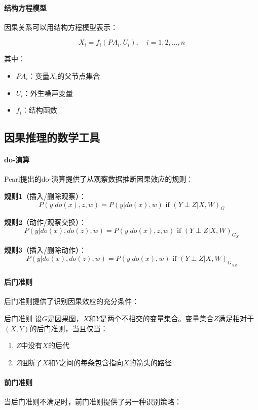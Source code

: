 \paragraph{结构方程模型}
因果关系可以用结构方程模型表示：

$$X_i = f_i(PA_i, U_i), \quad i = 1, 2, \ldots, n$$

其中：
\begin{itemize}
\item $PA_i$：变量$X_i$的父节点集合
\item $U_i$：外生噪声变量
\item $f_i$：结构函数
\end{itemize}

\subsection{因果推理的数学工具}

\paragraph{do-演算}
Pearl提出的do-演算提供了从观察数据推断因果效应的规则：

\textbf{规则1}（插入/删除观察）：
$$P(y|do(x), z, w) = P(y|do(x), w) \text{ if } (Y \perp Z | X, W)_G$$

\textbf{规则2}（动作/观察交换）：
$$P(y|do(x), do(z), w) = P(y|do(x), z, w) \text{ if } (Y \perp Z | X, W)_{G_{\overline{X}}}$$

\textbf{规则3}（插入/删除动作）：
$$P(y|do(x), do(z), w) = P(y|do(x), w) \text{ if } (Y \perp Z | X, W)_{G_{\overline{X}\underline{Z}}}$$

\paragraph{后门准则}
后门准则提供了识别因果效应的充分条件：

\begin{definition}[]{后门准则}
设$G$是因果图，$X$和$Y$是两个不相交的变量集合。变量集合$Z$满足相对于$(X,Y)$的后门准则，当且仅当：

\begin{enumerate}
\item $Z$中没有$X$的后代
\item $Z$阻断了$X$和$Y$之间的每条包含指向$X$的箭头的路径
\end{enumerate}
\end{definition}

\paragraph{前门准则}
当后门准则不满足时，前门准则提供了另一种识别策略：

